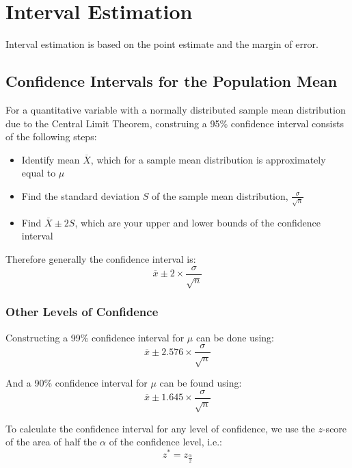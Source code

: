 \documentclass[12pt letter]{report}
\begin{document}

\section{Interval Estimation}


Interval estimation is based on the point estimate and the margin of error.

\subsection{Confidence Intervals for the Population Mean}

For a quantitative variable with a normally distributed sample mean distribution due to the Central Limit Theorem,
construing a 95\% confidence interval consists of the following steps:
\begin{itemize}
  \item Identify mean $\overline{X}$, which for a sample mean distribution is approximately equal to $\mu $
  \item Find the standard deviation $S$ of the sample mean distribution, $\frac{\sigma}{\sqrt{n}}$
  \item Find $\overline{X} \pm 2 S $, which are your upper and lower bounds of the confidence interval
\end{itemize}

Therefore generally the confidence interval is:
\[
  \overline{x} \pm 2 \times \frac{\sigma}{\sqrt{n}}
\]

\subsubsection{Other Levels of Confidence}

Constructing a 99\% confidence interval for $\mu $ can be done using:
\[
  \overline{x} \pm 2.576 \times \frac{\sigma}{\sqrt{n}}
\]

And a 90\% confidence interval for $\mu $ can be found using:
\[
  \overline{x} \pm 1.645 \times \frac{\sigma}{\sqrt{n}}
\]

To calculate the confidence interval for any level of confidence, we use the $z$-score of the area of half the $\alpha$ of the
confidence level, i.e.:
\[
  z^* = z_{\frac{\alpha}{2}}
\]
\end{document}
